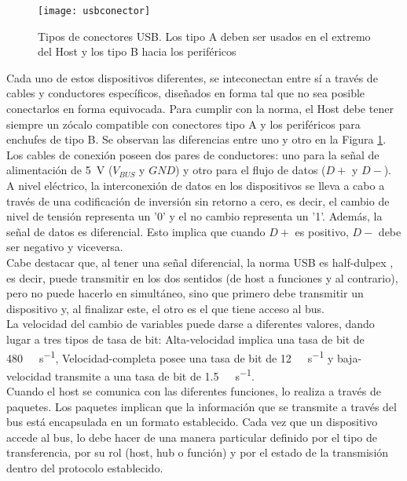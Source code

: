 \begin{figure}[b]
	\centering
	\texttt{[image: usbconector]}
	\caption{Tipos de conectores USB. Los tipo A deben ser usados en el extremo del Host y los tipo B hacia los periféricos\cite{USBHardwareWiki}}
	\label{fig:con}
\end{figure}

Cada uno de estos dispositivos diferentes, se inteconectan entre sí a través de cables y conductores específicos, diseñados en forma tal que no sea posible conectarlos en forma equivocada. Para cumplir con la norma, el Host debe tener siempre un zócalo compatible con conectores tipo A y los periféricos para enchufes de tipo B. Se observan las diferencias entre uno y otro en la Figura \ref{fig:con}. Los cables de conexión poseen dos pares de conductores: uno para la señal de alimentación de \SI{5}{\volt} ($V_{BUS}$ y $GND$) y otro para el flujo de datos ($D+$ y $D-$).\\

A nivel eléctrico, la interconexión de datos en los dispositivos se lleva a cabo a través de una codificación de inversión sin retorno a cero, es decir, el cambio de nivel de tensión representa un '0' y el no cambio representa un '1'. Además, la señal de datos es diferencial. Esto implica que cuando $D+$ es positivo, $D-$ debe ser negativo y viceversa.\\

Cabe destacar que, al tener una señal diferencial, la norma USB es {half-dulpex \it}, es decir, puede transmitir en los dos sentidos (de host a funciones y al contrario), pero no puede hacerlo en simultáneo\cite{Riihonen2015}, sino que primero debe transmitir un dispositivo y, al finalizar este, el otro es el que tiene acceso al bus.\\

La velocidad del cambio de variables puede darse a diferentes valores, dando lugar a tres tipos de tasa de bit: Alta-velocidad implica una tasa de bit de \SI{480}{\mega\bit\per\second}, Velocidad-completa posee una tasa de bit de \SI{12}{\mega\bit\per\second} y baja-velocidad transmite a una tasa de bit de \SI{1.5}{\mega\bit\per\second}.\\

Cuando el host se comunica con las diferentes funciones, lo realiza a través de paquetes. Los paquetes implican que la información que se transmite a través del bus está encapsulada en un formato establecido. Cada vez que un dispositivo accede al bus, lo debe hacer de una manera particular definido por el tipo de transferencia, por su rol (host, hub o función) y por el estado de la transmisión dentro del protocolo establecido.\\